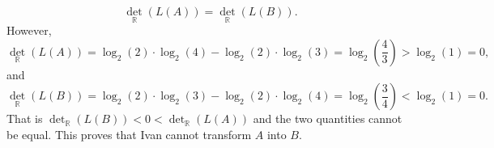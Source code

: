 \begin{solution}
    \[
        {\det}_{\mathbb{R}}\left(L\left(A\right)\right)= {\det}_{\mathbb{R}}\left(L\left(B\right)\right).
    \]
    However,
    \[
        {\det}_{\mathbb{R}}\left(L\left(A\right)\right) = \log_2\left(2\right) \cdot \log_2\left(4\right) - \log_2\left(2\right) \cdot \log_2\left(3\right) = \log_2\left(\frac{4}{3}\right) > \log_2\left(1\right) = 0,
    \]
    and
    \[
        {\det}_{\mathbb{R}}\left(L\left(B\right)\right) = \log_2\left(2\right) \cdot \log_2\left(3\right) - \log_2\left(2\right) \cdot \log_2\left(4\right) = \log_2\left(\frac{3}{4}\right) < \log_{2}\left(1\right) = 0.
    \]
    That is \( {\det}_{\mathbb{R}}\left(L\left(B\right)\right) < 0 < {\det}_{\mathbb{R}}\left(L\left(A\right)\right) \) and the two quantities cannot be equal. This proves that Ivan cannot transform \( A \) into \( B \).
\end{solution}
